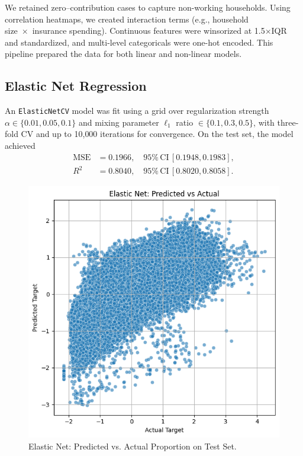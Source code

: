 \documentclass{article}
\begin{document}
We retained zero–contribution cases to capture non-working households. Using correlation heatmaps, we created interaction terms (e.g., household size × insurance spending). Continuous features were winsorized at 1.5×IQR and standardized, and multi-level categoricals were one-hot encoded. This pipeline prepared the data for both linear and non-linear models.

\subsection{Elastic Net Regression}
An \texttt{ElasticNetCV} model was fit using a grid over regularization strength $\alpha \in\{0.01,0.05,0.1\}$ and mixing parameter $\ell_1$ ratio $\in\{0.1,0.3,0.5\}$, with three-fold CV and up to 10{,}000 iterations for convergence. On the test set, the model achieved
\begin{align*}
  \mathrm{MSE} &= 0.1966, \quad 95\%\,\mathrm{CI}\,[0.1948,0.1983], \\
  R^2 &= 0.8040, \quad 95\%\,\mathrm{CI}\,[0.8020,0.8058].
\end{align*}

\begin{figure}[ht]
  \centering
  \includegraphics[width=0.75\linewidth]{figures/elastic_net_scatter.png}
  \caption{Elastic Net: Predicted vs. Actual Proportion on Test Set.}
  \label{fig:en_scatter}
\end{figure}
\end{document}
